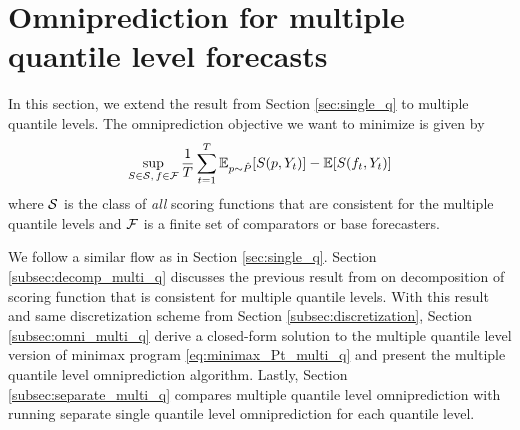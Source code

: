 \section{Omniprediction for multiple quantile level forecasts}\label{sec:multi_q}
In this section, we extend the result from Section \ref{sec:single_q} to multiple quantile levels. %
The omniprediction objective we want to minimize is given by
\[
\sup_{S \in \mathcal{S},\, f \in \mathcal{F}} \frac{1}{T} \sum_{t=1}^T \mathbb{E}_{p \sim \hat{P}} [S(p, Y_t)] - \mathbb{E}[S(f_t, Y_t)]
\]
where $\mathcal{S}$ is the class of \textit{all} scoring functions that are consistent for the multiple quantile levels and $\mathcal{F}$ is a finite set of comparators or base forecasters.

We follow a similar flow as in Section \ref{sec:single_q}. Section \ref{subsec:decomp_multi_q} discusses the previous result from \cite{fissler2016multiq} on decomposition of scoring function that is consistent for multiple quantile levels. With this result and same discretization scheme from Section \ref{subsec:discretization}, Section \ref{subsec:omni_multi_q} derive a closed-form solution to the multiple quantile level version of minimax program \eqref{eq:minimax_Pt_multi_q} and present the multiple quantile level omniprediction algorithm. Lastly, Section \ref{subsec:separate_multi_q} compares multiple quantile level omniprediction with running separate single quantile level omniprediction for each quantile level.




